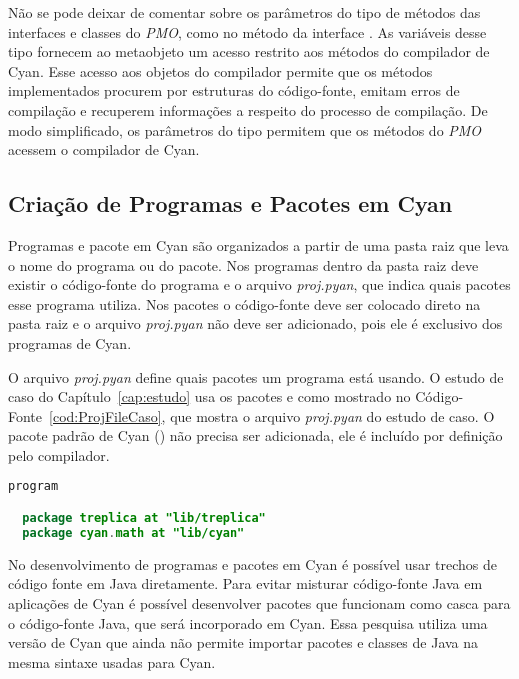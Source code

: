 Não se pode deixar de comentar sobre os parâmetros do tipo  de métodos das interfaces e classes do \emph{PMO}, como no método  da interface . As variáveis desse tipo fornecem ao metaobjeto um acesso restrito aos métodos do compilador de Cyan. Esse acesso aos objetos do compilador permite que os métodos implementados procurem por estruturas do código-fonte, emitam erros de compilação e recuperem informações a respeito do processo de compilação. De modo simplificado, os parâmetros do tipo  permitem que os métodos do \emph{PMO} acessem o compilador de Cyan.

\subsection{Criação de Programas e Pacotes em Cyan}
\label{sec:cyanlibapp}

Programas e pacote em Cyan são organizados a partir de uma pasta raiz que leva o nome do programa ou do pacote. Nos programas dentro da pasta raiz deve existir o código-fonte do programa e o arquivo \emph{proj.pyan}, que indica quais pacotes esse programa utiliza. Nos pacotes o código-fonte deve ser colocado direto na pasta raiz e o arquivo \emph{proj.pyan} não deve ser adicionado, pois ele é exclusivo dos programas de Cyan.

O arquivo \emph{proj.pyan} define quais pacotes um programa está usando. O estudo de caso do Capítulo~\ref{cap:estudo} usa os pacotes  e  como mostrado no Código-Fonte~\ref{cod:ProjFileCaso}, que mostra o arquivo \emph{proj.pyan} do estudo de caso. O pacote padrão de Cyan () não precisa ser adicionada, ele é incluído por definição pelo compilador.

\begin{lstlisting}[language=Java, caption={Arquivo \emph{proj.pyan} do estudo de caso}, label={cod:ProjFileCaso}]
program 

  package treplica at "lib/treplica"
  package cyan.math at "lib/cyan"
\end{lstlisting}

No desenvolvimento de programas e pacotes em Cyan é possível usar trechos de código fonte em Java diretamente. Para evitar misturar código-fonte Java em aplicações de Cyan é possível desenvolver pacotes que funcionam como casca para o código-fonte Java, que será incorporado em Cyan. Essa pesquisa utiliza uma versão de Cyan que ainda não permite importar pacotes e classes de Java na mesma sintaxe usadas para Cyan.


